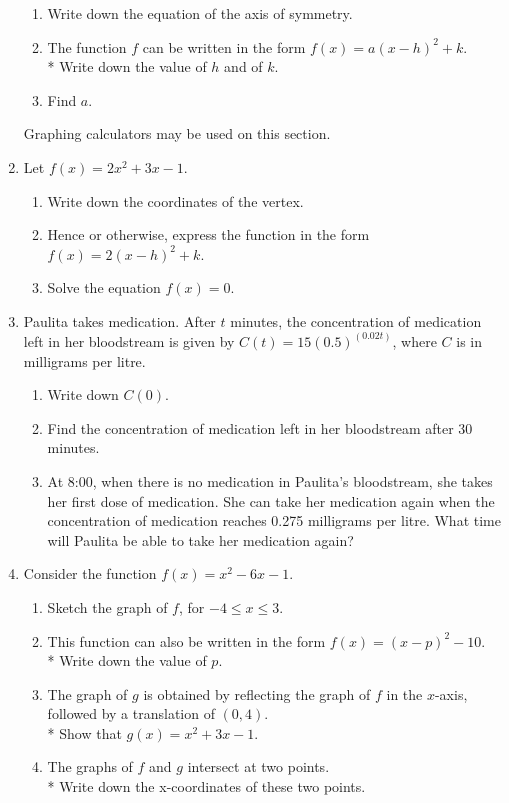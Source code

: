 \documentclass[]{book}
\begin{document}
\begin{enumerate}
\begin{enumerate}
    \item Write down the equation of the axis of symmetry.
    \item The function $f$ can be written in the form $f(x)=a(x-h)^2 +k$. \\*
    Write down the value of $h$ and of $k$.
    \item Find $a$.
\end{enumerate}

\newpage
Graphing calculators may be used on this section.

\item Let $f(x)=2x^2+3x-1$.
\begin{enumerate}
    \item Write down the coordinates of the vertex.
    \item Hence or otherwise, express the function in the form $f(x)=2(x-h)^2 +k$.
    \item Solve the equation  $f(x)=0$.
\end{enumerate}

\item Paulita takes medication. After $t$ minutes, the concentration of medication left in her bloodstream is given by $C(t)=15(0.5)^(0.02t)$, where $C$ is in milligrams per litre.
\begin{enumerate}
    \item Write down $C(0)$.
    \item Find the concentration of medication left in her bloodstream after 30 minutes.
    \item At 8:00, when there is no medication in Paulita's bloodstream, she takes her first dose of medication. She can take her medication again when the concentration of medication reaches 0.275 milligrams per litre. What time will Paulita be able to take her medication again?
\end{enumerate}

\item Consider the function $f(x)=x^2-6x-1$.
\begin{enumerate}
    \item Sketch the graph of $f$, for $-4 \leq x \leq 3$.
    \item This function can also be written in the form $f(x)=(x-p)^2 -10$.\\* 
    Write down the value of $p$.
    \item The graph of $g$ is obtained by reflecting the graph of $f$ in the $x$-axis, followed by a translation of $(0, 4)$.\\* Show that $g(x)=x^2+3x-1$.
    \item The graphs of $f$ and $g$ intersect at two points.\\*
    Write down the x-coordinates of these two points.
\end{enumerate}

\end{enumerate}
\end{document}
